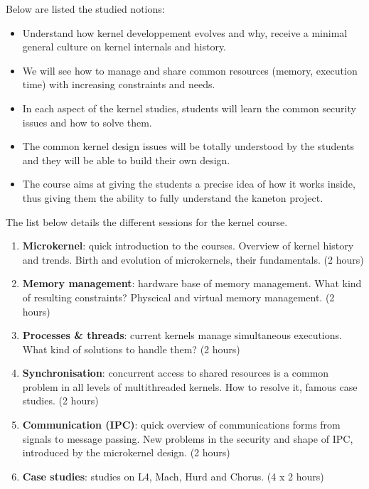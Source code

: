 \begin{multicols}{2}
Below are listed the studied notions:

\begin{itemize}
  \item
    Understand how kernel developpement evolves and why, receive a
    minimal general culture on kernel internals and history.
  \item
    We will see how to manage and share common resources (memory,
    execution time) with increasing constraints and needs.
  \item
    In each aspect of the kernel studies, students will learn the
    common security issues and how to solve them.
  \item
    The common kernel design issues will be totally understood by the
    students and they will be able to build their own design.
  \item
    The course aims at giving the students a precise idea of how it
    works inside, thus giving them the ability to fully understand
    the kaneton project.
\end{itemize}

The list below details the different sessions for the kernel course.

\begin{enumerate}
  \item
    \textbf{Microkernel}: quick introduction to the courses. Overview
    of kernel history and trends. Birth and evolution of microkernels, their
    fundamentals. (2 hours)
  \item
    \textbf{Memory management}: hardware base of memory management. What
    kind of resulting constraints? Physcical and virtual memory
    management. (2 hours)
  \item
    \textbf{Processes \& threads}: current kernels manage simultaneous
    executions. What kind of solutions to handle them? (2 hours)
  \item
    \textbf{Synchronisation}: concurrent access to shared resources is a
    common problem in all levels of multithreaded kernels. How to resolve it,
    famous case studies. (2 hours)
  \item
    \textbf{Communication (IPC)}: quick overview of communications forms
    from signals to message passing. New problems in the security and shape of
    IPC, introduced by the microkernel design. (2 hours)
  \item
    \textbf{Case studies}: studies on L4, Mach, Hurd and Chorus. (4 x 2 hours)
\end{enumerate}

\end{multicols}



